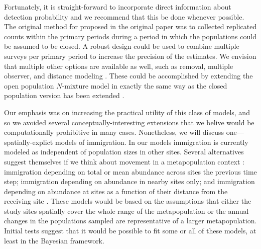 \documentclass[12pt]{article}
\begin{document}
Fortunately, it is straight-forward to incorporate direct information about
detection probability and we recommend that this be done whenever
possible. The original method for proposed in the original paper
was to collected replicated counts within the primary periods during
a period in which the populations could be assumed to be closed. A
robust design could be used to combine multiple surveys per
primary period to increase the precision of the estimates. We envision
that multiple other options are available as well, such as removal,
multiple observer, and distance modeling \citep{williams_etal:2002}. These could be
accomplished by extending the open population $N$-mixture model
in exactly the same way as the closed population version has been
extended \citep[e.g.,][]{royle_etal:2004}.

Our emphasis was on increasing the practical utility of this
class of models, and so we avoided several conceptually-interesting
extensions that we belive would be computationally prohibitive in many
cases. Nonetheless, we will discuss one---spatially-explict models of
immigration. 
In our models immigration is currently modeled as independent of
population sizes in other sites. Several alternatives suggest
themselves if we think about movement in a metapopulation
context \citep{hanski:1998}: immigration depending on total or mean
abundance across sites the previous time step; immigration
depending on abundance in nearby sites only; and immigration
depending on abundance at sites as a function of their distance
from the receiving site \citep{hastings:1991,hanski:1998}. These models would
be based on the assumptions that either the study sites
spatially cover the whole range of the metapopulation or the
annual changes in the populations sampled are representative of
a larger metapopulation. Initial tests suggest that it would be
possible to fit some or all of these models, at least in the
Bayesian framework.

\end{document}
